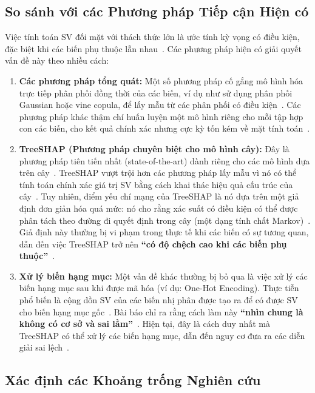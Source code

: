 \documentclass[12pt, a4paper]{article}
\begin{document}
\subsection*{So sánh với các Phương pháp Tiếp cận Hiện có}

Việc tính toán SV đối mặt với thách thức lớn là ước tính kỳ vọng có điều kiện, đặc biệt khi các biến phụ thuộc lẫn nhau~\citep{ref_270}. Các phương pháp hiện có giải quyết vấn đề này theo nhiều cách:

\begin{enumerate}
    \item \textbf{Các phương pháp tổng quát:} Một số phương pháp cố gắng mô hình hóa trực tiếp phân phối đồng thời của các biến, ví dụ như sử dụng phân phối Gaussian hoặc vine copula, để lấy mẫu từ các phân phối có điều kiện~\citep{ref_371}. Các phương pháp khác thậm chí huấn luyện một mô hình riêng cho mỗi tập hợp con các biến, cho kết quả chính xác nhưng cực kỳ tốn kém về mặt tính toán~\citep{ref_372}.

    \item \textbf{TreeSHAP (Phương pháp chuyên biệt cho mô hình cây):} Đây là phương pháp tiên tiến nhất (state-of-the-art) dành riêng cho các mô hình dựa trên cây~\citep{ref_281, ref_517}. TreeSHAP vượt trội hơn các phương pháp lấy mẫu vì nó có thể tính toán chính xác giá trị SV bằng cách khai thác hiệu quả cấu trúc của cây~\citep{ref_375}. Tuy nhiên, điểm yếu chí mạng của TreeSHAP là nó dựa trên một giả định đơn giản hóa quá mức: nó cho rằng xác suất có điều kiện có thể được phân tách theo đường đi quyết định trong cây (một dạng tính chất Markov)~\citep{ref_397, ref_401}. Giả định này thường bị vi phạm trong thực tế khi các biến có sự tương quan, dẫn đến việc TreeSHAP trở nên \textbf{``có độ chệch cao khi các biến phụ thuộc''}~\citep{ref_281}.

    \item \textbf{Xử lý biến hạng mục:} Một vấn đề khác thường bị bỏ qua là việc xử lý các biến hạng mục sau khi được mã hóa (ví dụ: One-Hot Encoding). Thực tiễn phổ biến là cộng dồn SV của các biến nhị phân được tạo ra để có được SV cho biến hạng mục gốc~\citep{ref_318}. Bài báo chỉ ra rằng cách làm này \textbf{``nhìn chung là không có cơ sở và sai lầm''}~\citep{ref_318}. Hiện tại, đây là cách duy nhất mà TreeSHAP có thể xử lý các biến hạng mục, dẫn đến nguy cơ đưa ra các diễn giải sai lệch~\citep{ref_285}.
\end{enumerate}

\subsection*{Xác định các Khoảng trống Nghiên cứu}
\end{document}
